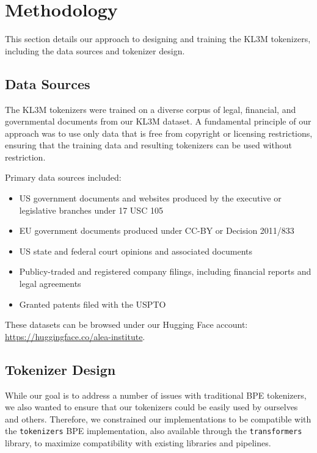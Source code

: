 \section{Methodology}

This section details our approach to designing and training the KL3M tokenizers, including the data sources and tokenizer design.

\subsection{Data Sources}

The KL3M tokenizers were trained on a diverse corpus of legal, financial, and governmental documents from our KL3M dataset. A fundamental principle of our approach was to use only data that is free from copyright or licensing restrictions, ensuring that the training data and resulting tokenizers can be used without restriction.

Primary data sources included:

\begin{itemize}
    \item US government documents and websites produced by the executive or legislative branches under 17 USC 105
    \item EU government documents produced under CC-BY or Decision 2011/833
    \item US state and federal court opinions and associated documents
    \item Publicy-traded and registered company filings, including financial reports and legal agreements
    \item Granted patents filed with the USPTO
\end{itemize}

These datasets can be browsed under our Hugging Face account: \url{https://huggingface.co/alea-institute}.

\subsection{Tokenizer Design}

While our goal is to address a number of issues with traditional BPE tokenizers, we also wanted to ensure that our tokenizers could be easily used by ourselves and others.  Therefore, we constrained our implementations to be compatible with the \texttt{tokenizers} BPE implementation, also available through the \texttt{transformers} library, to maximize compatibility with existing libraries and pipelines.

